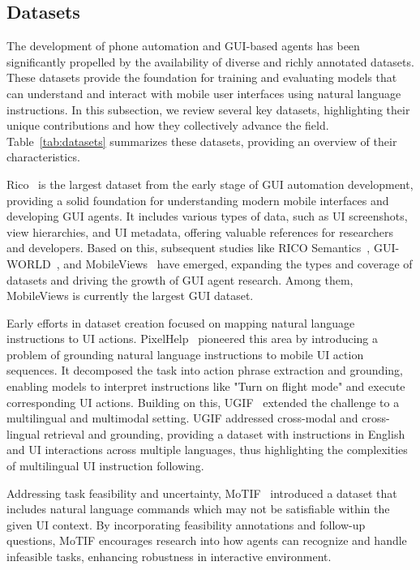 \subsection{Datasets}
\label{subsec:datasets}

The development of phone automation and GUI-based agents has been significantly propelled by the availability of diverse and richly annotated datasets. These datasets provide the foundation for training and evaluating models that can understand and interact with mobile user interfaces using natural language instructions. In this subsection, we review several key datasets, highlighting their unique contributions and how they collectively advance the field. Table~\ref{tab:datasets} summarizes these datasets, providing an overview of their characteristics.

Rico~\cite{deka2017rico} is the largest dataset from the early stage of GUI automation development, providing a solid foundation for understanding modern mobile interfaces and developing GUI agents. It includes various types of data, such as UI screenshots, view hierarchies, and UI metadata, offering valuable references for researchers and developers. Based on this, subsequent studies like RICO Semantics~\cite{sunkara2022towards}, GUI-WORLD~\cite{chen2024gui}, and MobileViews~\cite{gao2024mobileviews} have emerged, expanding the types and coverage of datasets and driving the growth of GUI agent research. Among them, MobileViews is currently the largest GUI dataset.


Early efforts in dataset creation focused on mapping natural language instructions to UI actions. PixelHelp~\cite{li2020PixelHelp} pioneered this area by introducing a problem of grounding natural language instructions to mobile UI action sequences. It decomposed the task into action phrase extraction and grounding, enabling models to interpret instructions like "Turn on flight mode" and execute corresponding UI actions. Building on this, UGIF~\cite{venkatesh2022ugif} extended the challenge to a multilingual and multimodal setting. UGIF addressed cross-modal and cross-lingual retrieval and grounding, providing a dataset with instructions in English and UI interactions across multiple languages, thus highlighting the complexities of multilingual UI instruction following.

Addressing task feasibility and uncertainty, MoTIF~\cite{burns2021motif} introduced a dataset that includes natural language commands which may not be satisfiable within the given UI context. By incorporating feasibility annotations and follow-up questions, MoTIF encourages research into how agents can recognize and handle infeasible tasks, enhancing robustness in interactive environment.

